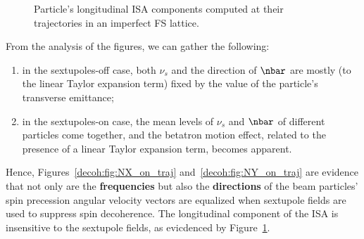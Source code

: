 \begin{figure}[!h]
	\centering
	\hfill
	\hfill
	\caption{Particle's longitudinal ISA components computed at their trajectories
          in an imperfect FS lattice.\label{decoh:fig:NZ_on_traj}}
\end{figure}

From the analysis of the figures, we can gather the following:
\begin{enumerate}
\item in the sextupoles-off case, both $\nu_s$ and the direction of $\nbar$ are mostly (to the
  linear Taylor expansion term) fixed by the value of the particle's transverse emittance;
\item in the sextupoles-on case, the mean levels of $\nu_s$ and $\nbar$ of different particles come
  together, and the betatron motion effect, related to the presence of a linear Taylor expansion term,
  becomes apparent.
\end{enumerate}
Hence, Figures~\ref{decoh:fig:NX_on_traj} and~\ref{decoh:fig:NY_on_traj} are evidence that not only are the
\textbf{frequencies} but also the \textbf{directions} of the beam particles' spin precession angular
velocity vectors are equalized when sextupole fields are used to suppress spin decoherence. The
longitudinal component of the ISA is insensitive to the sextupole fields, as evicdenced
by Figure~\ref{decoh:fig:NZ_on_traj}.

